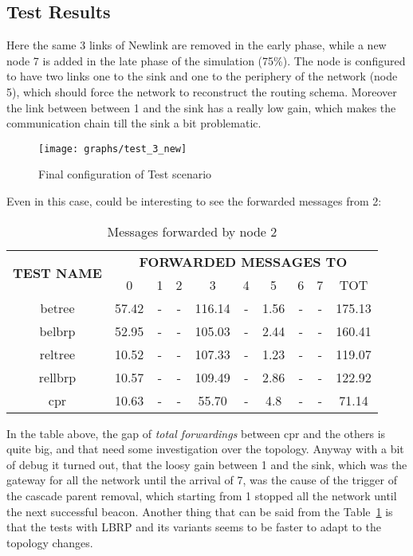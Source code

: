 \documentclass{article}
\begin{document}
	\subsection{Test Results}
Here the same 3 links of Newlink are removed in the early phase, while a new node 7 is added in the late phase of the simulation (75\%). The node is configured to have two links one to the sink and one to the periphery of the network (node 5), which should force the network to reconstruct the routing schema. Moreover the link between between 1 and the sink has a really low gain, which makes the communication chain till the sink a bit problematic.
		\begin{figure}[H]
			\begin{center}
				\texttt{[image: graphs/test\_3\_new]}
				\caption{Final configuration of Test scenario}
				\label{fig:testFinal}
			\end{center}
		\end{figure}
Even in this case, could be interesting to see the forwarded messages from 2:
		\begin{table}[H]
			\begin{center}
			    \begin{tabular}{|c|c|c|c|c|c|c|c|c|c|}
				    \hline
				    \multirow{2}{*}{\textbf{TEST NAME}} & \multicolumn{9}{c|}{\textbf{FORWARDED MESSAGES TO}} \\ \cline{2-10}
					& 0 & 1 & 2 & 3 & 4 & 5 & 6 & 7 & TOT \\ \hline
				    betree & 57.42 & - & - & 116.14 & - & 1.56 & - & - & 175.13 \\ \hline
				    belbrp & 52.95 & - & - & 105.03 & - & 2.44 & - & - & 160.41 \\ \hline
				    reltree & 10.52 & - & - & 107.33 & - & 1.23 & - & - & 119.07 \\ \hline
   				    rellbrp & 10.57 & - & - & 109.49 & - & 2.86 & - & - & 122.92 \\ \hline
				    cpr & 10.63 & - & - & 55.70 & - & 4.8 & - & - & 71.14 \\ \hline
			    \end{tabular}
			\end{center}	
			\caption{Messages forwarded by node 2}
			\label{tab:testF2}
		\end{table}
In the table above, the gap of \textit{total forwardings} between cpr and the others is quite big, and that need some investigation over the topology. Anyway with a bit of debug it turned out, that the loosy gain between 1 and the sink, which was the gateway for all the network until the arrival of 7, was the cause of the trigger of the cascade parent removal, which starting from 1 stopped all the network until the next successful beacon. Another thing that can be said from the Table~\ref{tab:testF2} is that the tests with LBRP and its variants seems to be faster to adapt to the topology changes. 
\end{document}
